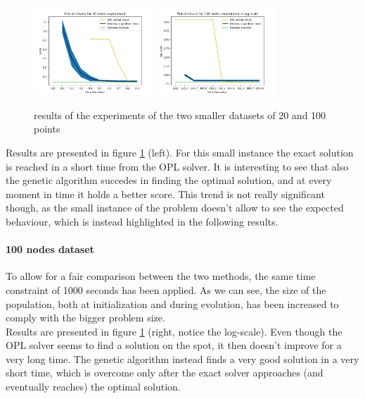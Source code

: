\documentclass{article}
\begin{document}
\begin{figure}
    \centering
\includegraphics[width=0.4\textwidth]{pics/20_nodes_results.png}
\includegraphics[width=0.4\textwidth]{pics/100_nodes_results.png}
 \caption{results of the experiments of the two smaller datasets of 20 and 100 points}
\label{fig:20and100points}
\end{figure}


Results are presented in figure \ref{fig:20and100points} (left).
For this small instance the exact solution is reached in a short time from the OPL solver. It is interesting to see that also the genetic algorithm succedes in finding the optimal solution, and at every moment in time it holds a better score. This trend is not really significant though, as the small instance of the problem doesn't allow to see the expected behaviour, which is instead highlighted in the following results. 

\paragraph*{100 nodes dataset}
To allow for a fair comparison between the two methods, the same time constraint of 1000 seconds has been applied. As we can see, the size of the population, both at initialization and during evolution, has been increased to comply with the bigger problem size. \\
Results are presented in figure \ref{fig:20and100points} (right, notice the log-scale). Even though the OPL solver seems to find a solution on the spot, it then doesn't improve for a very long time. The genetic algorithm instead finds a very good solution in a very short time, which is overcome only after the exact solver approaches (and eventually reaches) the optimal solution.
\end{document}
